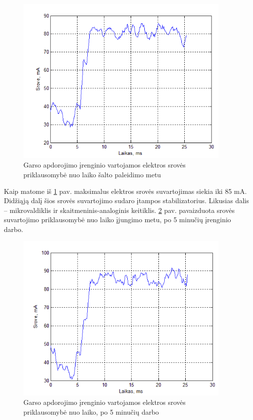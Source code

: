 \documentclass[]{vgtuef}
\begin{document}
\begin{figure}[htbp]
  \centering
  \includegraphics[width=400px]{img/sound_energy.png}
  \caption{Garso apdorojimo įrenginio vartojamos elektros srovės priklausomybė nuo laiko šalto paleidimo metu}
  \label{fig:sound_energy}
\end{figure}

Kaip matome iš \ref{fig:sound_energy} pav. maksimalus elektros srovės suvartojimas siekia iki 85 mA. Didžiąją dalį šios srovės suvartojimo sudaro įtampos stabilizatorius. Likusias dalis – mikrovaldiklis ir skaitmeninis-analoginis keitiklis. \ref{fig:sound_energy_5min} pav. pavaizduota srovės suvartojimo priklausomybė nuo laiko įjungimo metu, po 5 minučių įrenginio darbo.

\begin{figure}[htbp]
  \centering
  \includegraphics[width=400px]{img/sound_energy_5min.png}
  \caption{Garso apdorojimo įrenginio vartojamos elektros srovės priklausomybė nuo laiko, po 5 minučių darbo}
  \label{fig:sound_energy_5min}
\end{figure}
\end{document}
